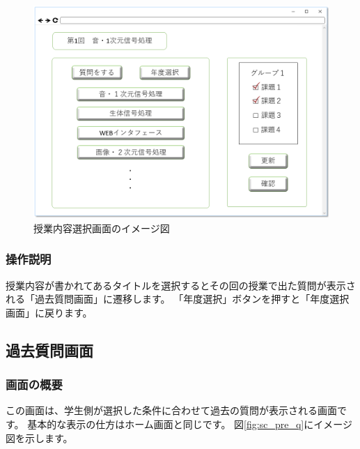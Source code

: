 \begin{figure}[htbp]
\begin{center}
  \includegraphics[width=1\linewidth,clip]{./img/sc_class_content.png}
  \caption{授業内容選択画面のイメージ図}\label{fig:sc_class_content}
\end{center}
\end{figure}

\subsubsection{操作説明}
授業内容が書かれてあるタイトルを選択するとその回の授業で出た質問が表示される「過去質問画面」に遷移します。
「年度選択」ボタンを押すと「年度選択画面」に戻ります。

\newpage

\subsection{過去質問画面}
\subsubsection{画面の概要}
この画面は、学生側が選択した条件に合わせて過去の質問が表示される画面です。
基本的な表示の仕方はホーム画面と同じです。
図\ref{fig:sc_pre_q}にイメージ図を示します。


